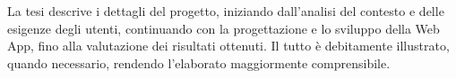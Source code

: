La tesi descrive i dettagli del progetto, iniziando dall'analisi del contesto e delle esigenze degli utenti, continuando con la progettazione e lo sviluppo della Web App, fino alla valutazione dei risultati ottenuti. Il tutto è debitamente illustrato, quando necessario, rendendo l'elaborato maggiormente comprensibile.


